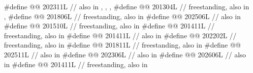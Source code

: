 \begin{codeblock}
#define @@                        202311L
  // also in , , , 
#define @@                    201304L // freestanding, also in , 
#define @@                     201806L // freestanding, also in 
#define @@                        202506L // also in 
#define @@     201510L // freestanding, also in 
#define @@               201411L // freestanding, also in 
#define @@         201411L // also in 
#define @@                       202202L // freestanding, also in 
#define @@                        201811L // freestanding, also in 
#define @@                          202511L // also in 
#define @@                           202306L // also in 
#define @@                    202606L // also in 
#define @@                            201411L // freestanding, also in 
\end{codeblock}

